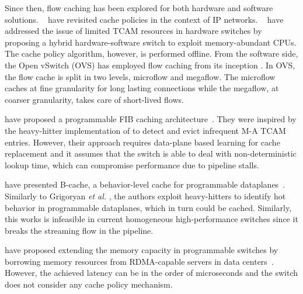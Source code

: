 Since then, flow caching has been explored for both hardware and software solutions.
\citeauthor{Kim:09}~\cite{Kim:09} have revisited cache policies in the context of IP networks.
\citeauthor{Katta:2014}~\cite{Katta:2014,Katta:2016} have addressed the issue of limited TCAM resources in hardware switches by proposing a hybrid hardware-software switch to exploit memory-abundant CPUs.
The cache policy algorithm, however, is performed offline. 
From the software side, the Open vSwitch (OVS) has employed flow caching from its inception \cite{Pfaff:15}.
In OVS, the flow cache is split in two levels, microflow and megaflow.
The microflow caches at fine granularity for long lasting connections while the megaflow, at coarser granularity, takes care of short-lived flows.

\citeauthor{Grigoryan:18} have proposed a programmable FIB caching architecture~\cite{Grigoryan:18}. They were inspired by the heavy-hitter implementation of \cite{Sivaraman:17} to detect and evict infrequent M-A TCAM entries. However, their approach requires data-plane based learning for cache replacement and it assumes that the switch is able to deal with non-deterministic lookup time, which can compromise performance due to pipeline stalls. 

\citeauthor{Zhang:2018} have presented B-cache, a behavior-level cache for programmable dataplanes~\cite{Zhang:2018}. Similarly to Grigoryan \textit{et al.} \cite{Grigoryan:18}, the authors exploit heavy-hitters to identify hot behavior in programmable dataplanes, which in turn could be cached. Similarly, this works is infeasible in current homogeneous high-performance switches since it breaks the streaming flow in the pipeline.

\citeauthor{Kim:2018} have proposed extending the memory capacity in programmable switches by borrowing memory resources from RDMA-capable servers in data centers~\cite{Kim:2018}. However, the achieved latency can be in the order of microseconds and the switch does not consider any cache policy mechanism.

